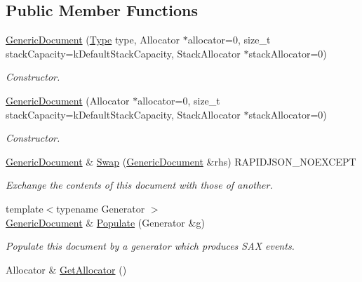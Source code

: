 \subsection*{Public Member Functions}
\begin{DoxyCompactItemize}
\item 
\hyperlink{class_generic_document_a3da21e72ec8f26b9da77d86cc1d41cdd}{Generic\+Document} (\hyperlink{rapidjson_8h_a1d1cfd8ffb84e947f82999c682b666a7}{Type} type, Allocator $\ast$allocator=0, size\+\_\+t stack\+Capacity=k\+Default\+Stack\+Capacity, Stack\+Allocator $\ast$stack\+Allocator=0)
\begin{DoxyCompactList}\small\item\em Constructor. \end{DoxyCompactList}\item 
\hyperlink{class_generic_document_a6b1c313ad538cafc4d23d4bd5f97178c}{Generic\+Document} (Allocator $\ast$allocator=0, size\+\_\+t stack\+Capacity=k\+Default\+Stack\+Capacity, Stack\+Allocator $\ast$stack\+Allocator=0)
\begin{DoxyCompactList}\small\item\em Constructor. \end{DoxyCompactList}\item 
\hyperlink{class_generic_document}{Generic\+Document} \& \hyperlink{class_generic_document_a6290e1290fad74177625af5938c0c58f}{Swap} (\hyperlink{class_generic_document}{Generic\+Document} \&rhs) R\+A\+P\+I\+D\+J\+S\+O\+N\+\_\+\+N\+O\+E\+X\+C\+E\+PT
\begin{DoxyCompactList}\small\item\em Exchange the contents of this document with those of another. \end{DoxyCompactList}\item 
{\footnotesize template$<$typename Generator $>$ }\\\hyperlink{class_generic_document}{Generic\+Document} \& \hyperlink{class_generic_document_a36fbc7d0a9595d26e0d2c8859d207d1f}{Populate} (Generator \&g)
\begin{DoxyCompactList}\small\item\em Populate this document by a generator which produces S\+AX events. \end{DoxyCompactList}\item 
\mbox{\label{class_generic_document_aa4609d6b19f86aec1a6b96edf2c27686}} 
Allocator \& \hyperlink{class_generic_document_aa4609d6b19f86aec1a6b96edf2c27686}{Get\+Allocator} ()

\end{DoxyCompactItemize}
